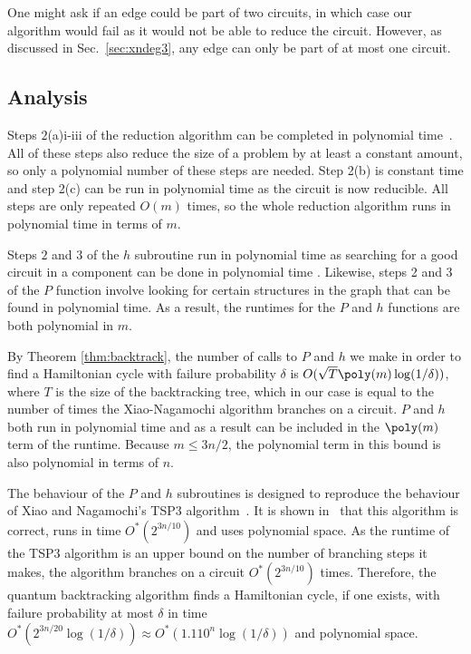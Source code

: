 One might ask if an edge could be part of two circuits, in which case our algorithm would fail as it would not be able to reduce the circuit. However, as discussed in Sec.\ \ref{sec:xndeg3}, any edge can only be part of at most one circuit.

\subsection{Analysis}

Steps $2$(a)i-iii of the reduction algorithm can be completed in polynomial time~\cite{xiao2016degree3}. All of these steps also reduce the size of a problem by at least a constant amount, so only a polynomial number of these steps are needed. Step 2(b) is constant time and step 2(c) can be run in polynomial time as the circuit is now reducible. All steps are only repeated $O(m)$ times, so the whole reduction algorithm runs in polynomial time in terms of $m$.

Steps $2$ and $3$ of the $h$ subroutine run in polynomial time as searching for a good circuit in a component can be done in polynomial time \cite{xiao2016degree3}. Likewise, steps 2 and 3 of the $P$ function involve looking for certain structures in the graph that can be found in polynomial time. As a result, the runtimes for the $P$ and $h$ functions are both polynomial in $m$.

By Theorem \ref{thm:backtrack}, the number of calls to $P$ and $h$ we make in order to find a Hamiltonian cycle with failure probability $\delta$ is $O(\sqrt{T}\poly(m)\log (1/\delta))$, where $T$ is the size of the backtracking tree, which in our case is equal to the number of times the Xiao-Nagamochi algorithm branches on a circuit. $P$ and $h$ both run in polynomial time and as a result can be included in the $\poly(m)$ term of the runtime. Because $m \leq 3n/2$, the polynomial term in this bound is also polynomial in terms of $n$.

The behaviour of the $P$ and $h$ subroutines is designed to reproduce the behaviour of Xiao and Nagamochi's TSP3 algorithm~\cite{xiao2016degree3}. It is shown in~\cite[Theorem 1]{xiao2016degree3} that this algorithm is correct, runs in time $O^*(2^{3n/10})$ and uses polynomial space. As the runtime of the TSP3 algorithm is an upper bound on the number of branching steps it makes, the algorithm branches on a circuit $O^*(2^{3n/10})$ times. Therefore, the quantum backtracking algorithm finds a Hamiltonian cycle, if one exists, with failure probability at most $\delta$ in time $O^*(2^{3n/20} \log(1/\delta)) \approx O^*(1.110^n \log(1/\delta))$ and polynomial space.

